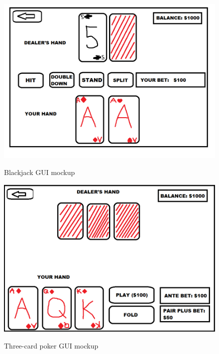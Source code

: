 \documentclass[10pt,conference,onecolumn,compsoc]{IEEEtran}
\begin{document}
\begin{figure}[h]
\caption{Blackjack GUI mockup}
\includegraphics[scale=0.4]{blackjack}
\label{fig:blackjack}
\centering
\end{figure}

\newpage

\begin{figure}[h]
\caption{Three-card poker GUI mockup}
\includegraphics[scale=0.4]{three-card}
\label{fig:three-card}
\centering
\end{figure}
\end{document}
